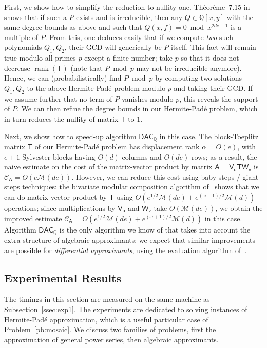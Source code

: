 \documentclass[sigconf]{acmart}
\newcommand{\vu}{\ensuremath{\mathsf{u}}}
\newcommand{\vv}{\ensuremath{\mathsf{v}}}
\newcommand{\mA}{\ensuremath{\mathsf{A}}}
\newcommand{\mT}{\ensuremath{\mathsf{T}}}
\newcommand{\mV}{\ensuremath{\mathsf{V}}}
\newcommand{\mW}{\ensuremath{\mathsf{W}}}
\newcommand{\Q}{\ensuremath{\mathbb{Q}}}
\newcommand{\M}{\ensuremath{\mathscr{M}}}
\newcommand{\CA}{\ensuremath{\mathscr{C}_\mA}}
\newcommand{\rank}{\ensuremath{\operatorname{rank}}}
\newcommand{\DACQ}{\ensuremath{\mathsf{DAC}_\Q}}
\theoremstyle{acmdefinition}
\begin{document}
First, we show how to simplify the reduction to nullity one.
Th\'eo\-r\`eme~7.15 in~\cite{BoChGiLeLeSaSc17} shows that if such a
$P$ exists and is irreducible, then any $Q \in \Q[x,y]$ with the same
degree bounds as above and such that $Q(x,f) = 0 \bmod x^{2de+1}$ is a
multiple of $P$.  From this, one deduces easily that if we compute
\emph{two} such polynomials $Q_1,Q_2$, their GCD will generically be
$P$ itself. This fact will remain true modulo all primes $p$ except a
finite number; take $p$ so that it does not decrease $\rank(\mT)$
(note that $P \bmod p$ may not be irreducible anymore). Hence, we can
(probabilistically) find $P \bmod p$ by computing two solutions
$Q_1,Q_2$ to the above Hermite-Pad\'e problem modulo $p$ and taking
their GCD. If we assume further that no term of $P$ vanishes modulo
$p$, this reveals the support of $P$. We can then refine the degree
bounds in our Hermite-Pad\'e problem, which in turn reduces the
nullity of matrix $\mT$ to $1$.

Next, we show how to speed-up algorithm $\DACQ$ in this case. The
block-Toeplitz matrix $\mT$ of our Hermite-Pad\'e problem has
displacement rank $\alpha = O(e)$, with $e+1$ Sylvester blocks having
$O(d)$ columns and $O(de)$ rows; as a result, the naive estimate on
the cost of the matrix-vector product by matrix $\mA = \mV_\vu \mT
\mW_\vv$ is $\CA=O(e \M(de))$. However, we can reduce this cost using
baby-steps / giant steps techniques: the bivariate modular composition
algorithm of~\cite{NuZi04} shows that we can do matrix-vector product
by $\mT$ using $O(e^{1/2} \M(de) + e^{(\omega+1)/2} \M(d))$
operations; since multiplications by $\mV_\vu$ and $\mW_\vv$ take
$O(\M(de))$, we obtain the improved estimate $\CA=O(e^{1/2} \M(de) +
e^{(\omega+1)/2} \M(d))$ in this case. Algorithm $\DACQ$ is the only
algorithm we know of that takes into account the extra structure of
algebraic approximants; we expect that similar improvements are
possible for {\em differential approximants}, using the evaluation
algorithm of~\cite{BoSc09}.

\vspace{-5px}
\subsection{Experimental Results}

The timings in this section are measured on the same machine as
Subsection~\ref{ssec:exp1}. The experiments are dedicated to solving
instances of Hermite-Pad\'e approximation, which is a useful
particular case of Problem~\ref{pb:mosaic}. We discuss two families of
problems, first the approximation of general power series, then
algebraic approximants.
\end{document}
